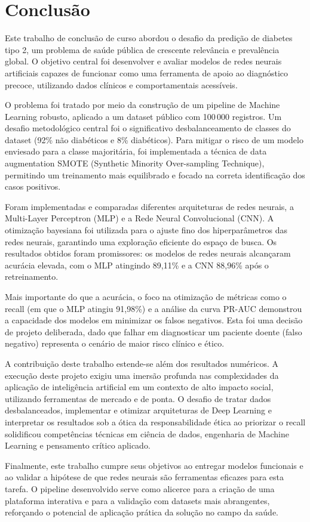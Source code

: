 \chapter{Conclusão}

Este trabalho de conclusão de curso abordou o desafio da predição de diabetes tipo 2, um problema de saúde pública de crescente relevância e prevalência global. O objetivo central foi desenvolver e avaliar modelos de redes neurais artificiais capazes de funcionar como uma ferramenta de apoio ao diagnóstico precoce, utilizando dados clínicos e comportamentais acessíveis.

O problema foi tratado por meio da construção de um pipeline de Machine Learning robusto, aplicado a um dataset público com 100\,000 registros. Um desafio metodológico central foi o significativo desbalanceamento de classes do dataset (92\% não diabéticos e 8\% diabéticos). Para mitigar o risco de um modelo enviesado para a classe majoritária, foi implementada a técnica de data augmentation SMOTE (Synthetic Minority Over-sampling Technique), permitindo um treinamento mais equilibrado e focado na correta identificação dos casos positivos.

Foram implementadas e comparadas diferentes arquiteturas de redes neurais, a Multi-Layer Perceptron (MLP) e a Rede Neural Convolucional (CNN). A otimização bayesiana foi utilizada para o ajuste fino dos hiperparâmetros das redes neurais, garantindo uma exploração eficiente do espaço de busca. Os resultados obtidos foram promissores: os modelos de redes neurais alcançaram acurácia elevada, com o MLP atingindo 89,11\% e a CNN 88,96\% após o retreinamento.

Mais importante do que a acurácia, o foco na otimização de métricas como o recall (em que o MLP atingiu 91,98\%) e a análise da curva PR-AUC demonstrou a capacidade dos modelos em minimizar os falsos negativos. Esta foi uma decisão de projeto deliberada, dado que falhar em diagnosticar um paciente doente (falso negativo) representa o cenário de maior risco clínico e ético.

A contribuição deste trabalho estende-se além dos resultados numéricos. A execução deste projeto exigiu uma imersão profunda nas complexidades da aplicação de inteligência artificial em um contexto de alto impacto social, utilizando ferramentas de mercado e de ponta. O desafio de tratar dados desbalanceados, implementar e otimizar arquiteturas de Deep Learning e interpretar os resultados sob a ótica da responsabilidade ética ao priorizar o recall solidificou competências técnicas em ciência de dados, engenharia de Machine Learning e pensamento crítico aplicado.

Finalmente, este trabalho cumpre seus objetivos ao entregar modelos funcionais e ao validar a hipótese de que redes neurais são ferramentas eficazes para esta tarefa. O pipeline desenvolvido serve como alicerce para a criação de uma plataforma interativa e para a validação com datasets mais abrangentes, reforçando o potencial de aplicação prática da solução no campo da saúde.
